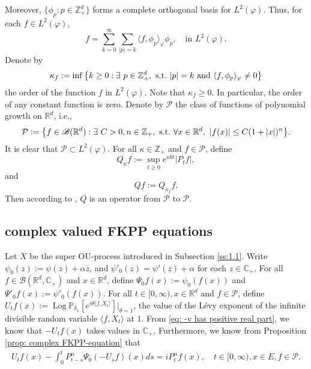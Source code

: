 \documentclass[12pt,a4paper]{amsart}
\theoremstyle{plain}
\theoremstyle{definition}
\numberwithin{equation}{section}
\begin{document}
    Moreover, $\{\phi_p: p \in \mathbb Z_+^d\}$ forms a complete orthogonal basis for $L^2(\varphi)$.
    Thus, for each $f\in L^2(\varphi)$,
\begin{equation}\label{semicomp1}
    f
    =\sum_{k=0}^{\infty}\sum_{|p|=k}\langle f, \phi_p \rangle_{\varphi} \phi_p,
    \quad \text{in~} L^2(\varphi).
\end{equation}
    Denote by
\begin{equation}\label{order}
    \kappa_f
    :=\inf \left \{k\geq 0: \exists ~ p\in \mathbb Z_+^d ,{\rm ~s.t.~}|p|=k {\rm ~and~}  \langle f, \phi_p \rangle_{\varphi}\neq 0\right \}
\end{equation}
    the order of the function $f$ in $L^2(\varphi)$.
    Note that $ \kappa_f\geq 0$.
    In particular, the order of any constant function is zero.
    Denote by $\mathcal P$ the class of functions of polynomial growth on $\mathbb R^d$, i.e.,
\begin{equation}
    \mathcal{P}
    :=\big \{f\in \mathscr B(\mathbb R^d):\exists~ C>0, n \in \mathbb Z_+, {\rm ~s.t.~} \forall x\in \mathbb R^d,~ |f(x)|\leq C(1+|x|)^n\big\}.
\end{equation}
    It is clear that $\mathcal{P} \subset L^2(\varphi)$.
    For all $\kappa \in \mathbb Z_+$ and $f\in \mathcal P$, define
\begin{equation}\label{Q_k}
Q_\kappa f := \sup_{t\geq 0} e^{\kappa b t}|P_t f|,
\end{equation}
and
\begin{equation}\label{Q}
Q f:= Q_{\kappa_f}f.
\end{equation}
    Then according to \cite[Fact 1.2]{MM}, $Q$ is an operator from $\mathcal P$ to $\mathcal P$.

\subsection{complex valued FKPP equations}
    Let $X$ be the super OU-process introduced in Subsection \ref{ss:1.1}.    
   Write $\psi_0(z) := \psi(z) + \alpha z$,
   and $\psi'_0(z) = \psi'(z) + \alpha$ for each $z\in \mathbb C_+$.
    For all $f\in \mathcal B(\mathbb R^d, \mathbb C_+)$ and $x\in \mathbb R^d$, define $\Psi_0f(x) := \psi_0(f(x))$ and $\Psi'_0 f(x) := \psi'_0(f(x))$.
    For all $t\in [0,\infty), x\in \mathbb R^d $ and $f \in \mathcal{P}$, define $U_tf(x) := \operatorname{Log} \mathbb P_{\delta_x}[e^{i\theta \langle f, X_t\rangle}]|_{\theta = 1}$, the value of the L\'evy exponent of the infinite divisible random variable $\langle f, X_t\rangle$ at $1$.
    From \eqref{eq: -v has positive real part}, we know that $-U_tf(x)$ takes values in $\mathbb C_+$. Furthermore, we know from Proposition \ref{prop: complex FKPP-equation} that
\begin{equation}\begin{split}
\label{eq:chareq2}
    U_tf(x)-\int_0^t P^\alpha_{t-s} \Psi_0(-U_sf)(x)ds
    =i P^{\alpha}_t f(x),
    \quad t\in [0,\infty), x\in E, f\in \mathcal P.
\end{split}\end{equation}
\end{document}
